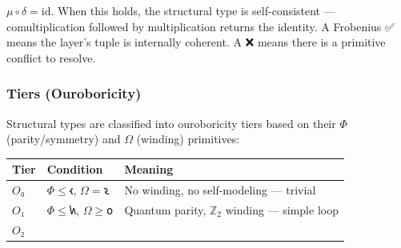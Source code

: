 \(\mu\circ\delta=\text{id}\). When this holds, the structural type is
self-consistent --- comultiplication followed by multiplication returns
the identity. A Frobenius ✅ means the layer's tuple is internally
coherent. A ❌ means there is a primitive conflict to resolve.

\hypertarget{tiers-ouroboricity}{%
\subsubsection{Tiers (Ouroboricity)}\label{tiers-ouroboricity}}

Structural types are classified into ouroboricity tiers based on their
\(\Phi\) (parity/symmetry) and \(\Omega\) (winding) primitives:

\begin{longtable}[]{@{}lll@{}}
\toprule
\begin{minipage}[b]{0.21\columnwidth}\raggedright
Tier\strut
\end{minipage} & \begin{minipage}[b]{0.39\columnwidth}\raggedright
Condition\strut
\end{minipage} & \begin{minipage}[b]{0.32\columnwidth}\raggedright
Meaning\strut
\end{minipage}\tabularnewline
\midrule
\endhead
\begin{minipage}[t]{0.21\columnwidth}\raggedright
\(O₀\)\strut
\end{minipage} & \begin{minipage}[t]{0.39\columnwidth}\raggedright
\(\Phi \leq 𐑬\), \(\Omega = 𐑷\)\strut
\end{minipage} & \begin{minipage}[t]{0.32\columnwidth}\raggedright
No winding, no self-modeling --- trivial\strut
\end{minipage}\tabularnewline
\begin{minipage}[t]{0.21\columnwidth}\raggedright
\(O₁\)\strut
\end{minipage} & \begin{minipage}[t]{0.39\columnwidth}\raggedright
\(\Phi \leq 𐑿\), \(\Omega \geq 𐑴\)\strut
\end{minipage} & \begin{minipage}[t]{0.32\columnwidth}\raggedright
Quantum parity, \(\mathbb{Z}_2\) winding --- simple loop\strut
\end{minipage}\tabularnewline
\begin{minipage}[t]{0.21\columnwidth}\raggedright
\(O₂\)\strut

\end{minipage}
\end{longtable}
